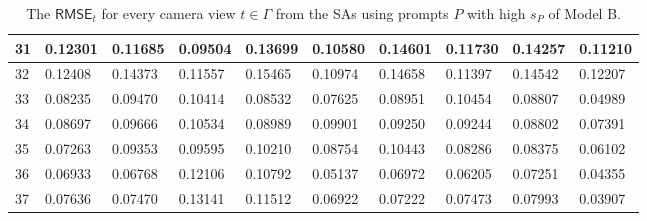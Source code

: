 \begin{table}[H]
{\begin{tabular}{|l|l|l|l|l|l|l|l|l|l|}
        31 & 0.12301 & 0.11685 & 0.09504 & 0.13699 & 0.10580 & 0.14601 & 0.11730 & 0.14257 & 0.11210 \\ \hline
        32 & 0.12408 & 0.14373 & 0.11557 & 0.15465 & 0.10974 & 0.14658 & 0.11397 & 0.14542 & 0.12207 \\ \hline
        33 & 0.08235 & 0.09470 & 0.10414 & 0.08532 & 0.07625 & 0.08951 & 0.10454 & 0.08807 & 0.04989 \\ \hline
        34 & 0.08697 & 0.09666 & 0.10534 & 0.08989 & 0.09901 & 0.09250 & 0.09244 & 0.08802 & 0.07391 \\ \hline
        35 & 0.07263 & 0.09353 & 0.09595 & 0.10210 & 0.08754 & 0.10443 & 0.08286 & 0.08375 & 0.06102 \\ \hline
        36 & 0.06933 & 0.06768 & 0.12106 & 0.10792 & 0.05137 & 0.06972 & 0.06205 & 0.07251 & 0.04355 \\ \hline
        37 & 0.07636 & 0.07470 & 0.13141 & 0.11512 & 0.06922 & 0.07222 & 0.07473 & 0.07993 & 0.03907 \\ \hline
    \end{tabular}}
	\caption{The $ \mathsf{RMSE}_t$ for every camera view $t \in \varGamma$ from the SAs using prompts $P$ with high $s_P$ of Model B.}

\end{table}

